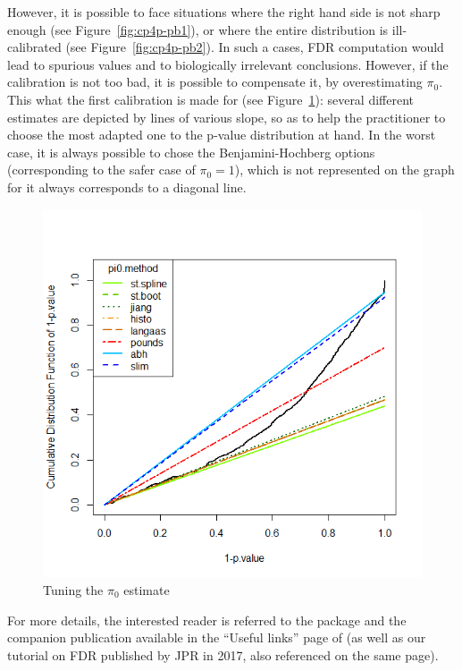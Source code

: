 \documentclass[12pt]{article}
\begin{document}
However, it is possible to face situations where the right hand side is not sharp enough (see Figure~\ref{fig:cp4p-pb1}), or where the entire distribution is ill-calibrated (see Figure~\ref{fig:cp4p-pb2}).
In such a cases, FDR computation would lead to spurious values and to biologically irrelevant conclusions. However, if the calibration is not too bad, it is possible to compensate it, by overestimating $\pi_0$. This what the first calibration is made for (see Figure~\ref{fig:cp4p-choice}): several different estimates are depicted by lines of various slope, so as to help the practitioner to choose the most adapted one to the p-value distribution at hand. In the worst case, it is always possible to chose the Benjamini-Hochberg options (corresponding to the safer case of $\pi_0=1$), which is not represented on the graph for it always corresponds to a diagonal line.

\begin {figure}
\includegraphics[width=\textwidth]{images/cp4p-choice.png}
\caption{Tuning the $\pi_0$ estimate}\label{fig:cp4p-choice}
\end {figure}

For more details, the interested reader is referred to the  package and the companion publication available in the ``Useful links'' page of  (as well as our tutorial on FDR published by JPR in 2017, also referenced on the same page).
\end{document}
